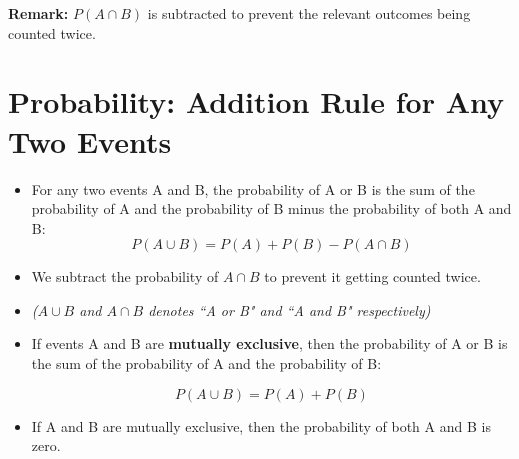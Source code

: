 \documentclass[]{report}
\begin{document}
\noindent \textbf{Remark:} $P(A\cap B)$ is subtracted to prevent the relevant outcomes being
counted twice.




\section{Probability: Addition Rule for Any Two Events}

\begin{itemize}
\item For any two events A and B, the probability of A or B is the sum of the probability of A and the probability of B minus the probability of both A and B:
\[P(A \cup B) = P(A) + P(B) - P(A \cap B)\]
\vspace{-0.2cm}
\item We subtract the probability of $A \cap B$ to prevent it getting counted twice.

\item \textit{($A \cup B$ and $A \cap B$ denotes  ``A or B" and ``A and B" respectively) }

\item If events A and B are \textbf{mutually exclusive}, then the probability of A or B is the sum of the probability of A and the probability of B:

\[P(A \cup B) = P(A) + P(B)\]

\item If A and B are mutually exclusive, then the probability of both A and B is zero.
\end{itemize}
\end{document}
